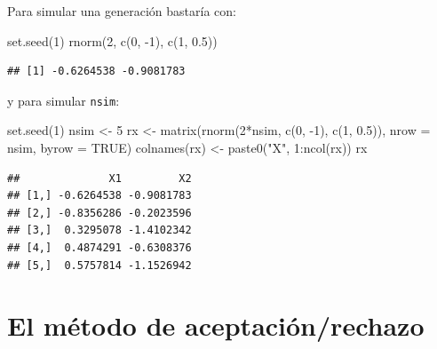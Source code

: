 \documentclass[
]{book}
\newenvironment{Shaded}{\begin{snugshade}}{\end{snugshade}}
\newcommand{\AttributeTok}[1]{\textcolor[rgb]{0.77,0.63,0.00}{#1}}
\newcommand{\ConstantTok}[1]{\textcolor[rgb]{0.00,0.00,0.00}{#1}}
\newcommand{\DecValTok}[1]{\textcolor[rgb]{0.00,0.00,0.81}{#1}}
\newcommand{\FloatTok}[1]{\textcolor[rgb]{0.00,0.00,0.81}{#1}}
\newcommand{\FunctionTok}[1]{\textcolor[rgb]{0.00,0.00,0.00}{#1}}
\newcommand{\NormalTok}[1]{#1}
\newcommand{\OtherTok}[1]{\textcolor[rgb]{0.56,0.35,0.01}{#1}}
\newcommand{\SpecialCharTok}[1]{\textcolor[rgb]{0.00,0.00,0.00}{#1}}
\newcommand{\StringTok}[1]{\textcolor[rgb]{0.31,0.60,0.02}{#1}}
\theoremstyle{break}
\theoremstyle{definition}
\theoremstyle{definition}
\theoremstyle{definition}
\theoremstyle{definition}
\theoremstyle{remark}
\begin{document}
Para simular una generación bastaría con:

\begin{Shaded}
\begin{Highlighting}[]
\FunctionTok{set.seed}\NormalTok{(}\DecValTok{1}\NormalTok{)}
\FunctionTok{rnorm}\NormalTok{(}\DecValTok{2}\NormalTok{, }\FunctionTok{c}\NormalTok{(}\DecValTok{0}\NormalTok{, }\SpecialCharTok{{-}}\DecValTok{1}\NormalTok{), }\FunctionTok{c}\NormalTok{(}\DecValTok{1}\NormalTok{, }\FloatTok{0.5}\NormalTok{))}
\end{Highlighting}
\end{Shaded}

\begin{verbatim}
## [1] -0.6264538 -0.9081783
\end{verbatim}

y para simular \texttt{nsim}:

\begin{Shaded}
\begin{Highlighting}[]
\FunctionTok{set.seed}\NormalTok{(}\DecValTok{1}\NormalTok{)}
\NormalTok{nsim }\OtherTok{\textless{}{-}} \DecValTok{5}
\NormalTok{rx }\OtherTok{\textless{}{-}} \FunctionTok{matrix}\NormalTok{(}\FunctionTok{rnorm}\NormalTok{(}\DecValTok{2}\SpecialCharTok{*}\NormalTok{nsim, }\FunctionTok{c}\NormalTok{(}\DecValTok{0}\NormalTok{, }\SpecialCharTok{{-}}\DecValTok{1}\NormalTok{), }\FunctionTok{c}\NormalTok{(}\DecValTok{1}\NormalTok{, }\FloatTok{0.5}\NormalTok{)), }\AttributeTok{nrow =}\NormalTok{ nsim, }\AttributeTok{byrow =} \ConstantTok{TRUE}\NormalTok{)}
\FunctionTok{colnames}\NormalTok{(rx) }\OtherTok{\textless{}{-}} \FunctionTok{paste0}\NormalTok{(}\StringTok{"X"}\NormalTok{, }\DecValTok{1}\SpecialCharTok{:}\FunctionTok{ncol}\NormalTok{(rx))}
\NormalTok{rx}
\end{Highlighting}
\end{Shaded}

\begin{verbatim}
##              X1         X2
## [1,] -0.6264538 -0.9081783
## [2,] -0.8356286 -0.2023596
## [3,]  0.3295078 -1.4102342
## [4,]  0.4874291 -0.6308376
## [5,]  0.5757814 -1.1526942
\end{verbatim}

\hypertarget{el-muxe9todo-de-aceptaciuxf3nrechazo}{%
\section{El método de aceptación/rechazo}\label{el-muxe9todo-de-aceptaciuxf3nrechazo}}
\end{document}
